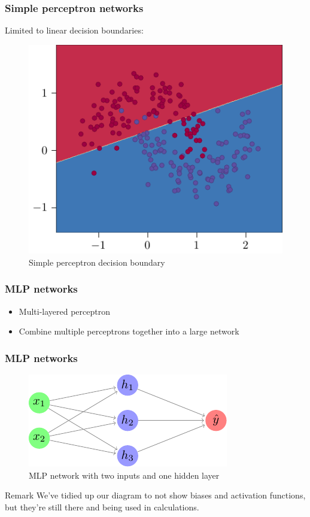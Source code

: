 \documentclass{beamer}
\begin{document}
\begin{frame}
    \frametitle{Simple perceptron networks}
    Limited to linear decision boundaries:
    \begin{figure}
        \centering
        \includegraphics[height=0.6\textheight]{figures/linear-boundary/main.pdf}
        \caption{Simple perceptron decision boundary}
    \end{figure}
\end{frame}

\begin{frame}
    \frametitle{MLP networks}
    \begin{itemize}
        \item Multi-layered perceptron
        \item Combine multiple perceptrons together into a large network
    \end{itemize}
\end{frame}

\begin{frame}
    \frametitle{MLP networks}
    \begin{figure}
        \includegraphics{figures/basic-mlp/main.pdf}
        \caption{MLP network with two inputs and one hidden layer}
    \end{figure}
    \begin{block}{Remark}
        We've tidied up our diagram to not show biases and activation functions, but they're still there and being used in calculations.
    \end{block}
\end{frame}
\end{document}
